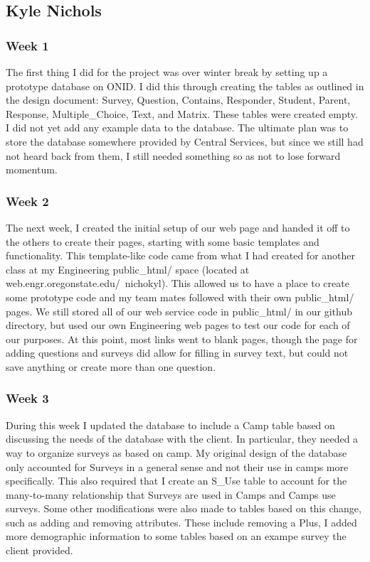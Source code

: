 \documentclass[letterpaper,10pt,serif, draftclsnofoot,onecolumn, compsoc, titlepage]{IEEEtran}
\begin{document}
\subsection{Kyle Nichols}
\subsubsection{Week 1}
The first thing I did for the project was over winter break by setting up a prototype database on ONID.
I did this through creating the tables as outlined in the design document: Survey, Question, Contains, Responder, Student, Parent, Response, Multiple\_Choice, Text, and Matrix.
These tables were created empty.
I did not yet add any example data to the database.
The ultimate plan was to store the database somewhere provided by Central Services, but since we still had not heard back from them, I still needed something so as not to lose forward momentum.
\subsubsection{Week 2}
The next week, I created the initial setup of our web page and handed it off to the others to create their pages, starting with some basic templates and functionality.
This template-like code came from what I had created for another class at my Engineering public\_html/ space (located at web.engr.oregonstate.edu/~nichokyl).
This allowed us to have a place to create some prototype code and my team mates followed with their own public\_html/ pages.
We still stored all of our web service code in public\_html/ in our github directory, but used our own Engineering web pages to test our code for each of our purposes.
At this point, most links went to blank pages, though the page for adding questions and surveys did allow for filling in survey text, but could not save anything or create more than one question.
\subsubsection{Week 3}
During this week I updated the database to include a Camp table based on discussing the needs of the database with the client.
In particular, they needed a way to organize surveys as based on camp.
My original design of the database only accounted for Surveys in a general sense and not their use in camps more specifically.
This also required that I create an S\_Use table to account for the many-to-many relationship that Surveys are used in Camps and Camps use surveys.
Some other modifications were also made to tables based on this change, such as adding and removing attributes.
These include removing a 
Plus, I added more demographic information to some tables based on an exampe survey the client provided.
\end{document}
